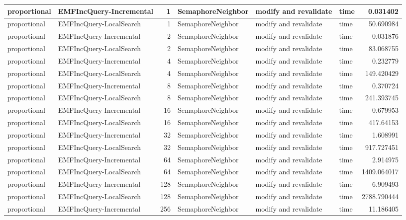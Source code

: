 \begin{table}
\begin{tabular}{| l | l | r | l | l | l | r |}
proportional & EMFIncQuery-Incremental & 1 & SemaphoreNeighbor & modify and revalidate & time & 0.031402\\\hline
proportional & EMFIncQuery-LocalSearch & 1 & SemaphoreNeighbor & modify and revalidate & time & 50.690984\\\hline
proportional & EMFIncQuery-Incremental & 2 & SemaphoreNeighbor & modify and revalidate & time & 0.031876\\\hline
proportional & EMFIncQuery-LocalSearch & 2 & SemaphoreNeighbor & modify and revalidate & time & 83.068755\\\hline
proportional & EMFIncQuery-Incremental & 4 & SemaphoreNeighbor & modify and revalidate & time & 0.232779\\\hline
proportional & EMFIncQuery-LocalSearch & 4 & SemaphoreNeighbor & modify and revalidate & time & 149.420429\\\hline
proportional & EMFIncQuery-Incremental & 8 & SemaphoreNeighbor & modify and revalidate & time & 0.370724\\\hline
proportional & EMFIncQuery-LocalSearch & 8 & SemaphoreNeighbor & modify and revalidate & time & 241.393745\\\hline
proportional & EMFIncQuery-Incremental & 16 & SemaphoreNeighbor & modify and revalidate & time & 0.679953\\\hline
proportional & EMFIncQuery-LocalSearch & 16 & SemaphoreNeighbor & modify and revalidate & time & 417.64153\\\hline
proportional & EMFIncQuery-Incremental & 32 & SemaphoreNeighbor & modify and revalidate & time & 1.608991\\\hline
proportional & EMFIncQuery-LocalSearch & 32 & SemaphoreNeighbor & modify and revalidate & time & 917.727451\\\hline
proportional & EMFIncQuery-Incremental & 64 & SemaphoreNeighbor & modify and revalidate & time & 2.914975\\\hline
proportional & EMFIncQuery-LocalSearch & 64 & SemaphoreNeighbor & modify and revalidate & time & 1409.064017\\\hline
proportional & EMFIncQuery-Incremental & 128 & SemaphoreNeighbor & modify and revalidate & time & 6.909493\\\hline
proportional & EMFIncQuery-LocalSearch & 128 & SemaphoreNeighbor & modify and revalidate & time & 2788.790444\\\hline
proportional & EMFIncQuery-Incremental & 256 & SemaphoreNeighbor & modify and revalidate & time & 11.186405\\\hline

\end{tabular}
\end{table}
